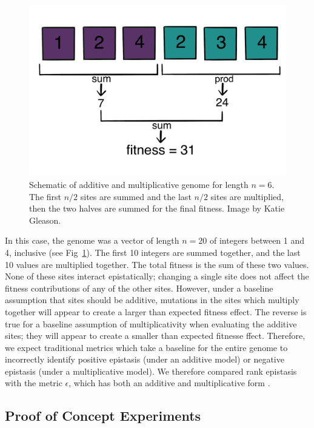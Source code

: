 \begin{figure}
    \centering
    \includegraphics{chapters/1-rank-epistasis/figs/ADDMULT.PNG}
    \caption{Schematic of additive and multiplicative genome for length $n=6$. The first $n/2$ sites are summed and the last $n/2$ sites are multiplied, then the two halves are summed for the final fitness. Image by Katie Gleason.}
    \label{fig:method:admult}
\end{figure}

In this case, the genome was a vector of length $n=20$ of integers between 1 and 4, inclusive (see Fig~\ref{fig:method:admult}). The first 10 integers are summed together, and the last 10 values are multiplied together. The total fitness is the sum of these two values. None of these sites interact epistatically; changing a single site does not affect the fitness contributions of any of the other sites. However, under a baseline assumption that sites should be additive, mutations in the sites which multiply together will appear to create a larger than expected fitness effect. The reverse is true for a baseline assumption of multiplicativity when evaluating the additive sites; they will appear to create a smaller than expected fitnesse ffect. Therefore, we expect traditional metrics which take a baseline for the entire genome to incorrectly identify positive epistasis (under an additive model) or negative epistasis (under a multiplicative model). We therefore compared rank epistasis with the metric $\epsilon$, which has both an additive and multiplicative form \citep{ostman_impact_2011}. 

\subsection{Proof of Concept Experiments}



